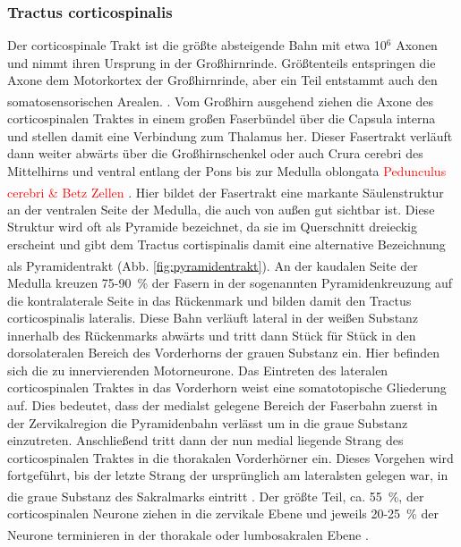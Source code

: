 \documentclass[12pt,a4paper,pdftex]{article}
\begin{document}
\subsubsection{Tractus corticospinalis} 
Der corticospinale Trakt ist die größte absteigende Bahn mit etwa 10$^{6}$ Axonen und nimmt ihren Ursprung in der Großhirnrinde. Größtenteils entspringen die Axone dem Motorkortex der Großhirnrinde, aber ein Teil entstammt auch den somatosensorischen Arealen. \textsuperscript{\cite[14]{neurowissenschaften_baer}}. 
Vom Großhirn ausgehend ziehen die Axone des corticospinalen Traktes in einem großen Faserbündel über die Capsula interna und stellen damit eine Verbindung zum Thalamus her. Dieser Fasertrakt verläuft dann weiter abwärts über die Großhirnschenkel oder auch Crura cerebri des Mittelhirns und ventral entlang der Pons bis zur Medulla oblongata \textcolor{red}{Pedunculus cerebri \& Betz Zellen} \textsuperscript{\cite[8]{crossman2014neuroanatomy}}. Hier bildet der Fasertrakt eine markante Säulenstruktur an der ventralen Seite der Medulla, die auch von außen gut sichtbar ist. Diese Struktur wird oft als Pyramide bezeichnet, da sie im Querschnitt dreieckig erscheint und gibt dem Tractus cortispinalis damit eine alternative Bezeichnung als Pyramidentrakt  \textsuperscript{\cite[14]{neurowissenschaften_baer}} (Abb. \ref{fig:pyramidentrakt}). An der kaudalen Seite der Medulla kreuzen 75-90~\% der Fasern in der sogenannten Pyramidenkreuzung auf die kontralaterale Seite in das Rückenmark und bilden damit den Tractus corticospinalis lateralis. Diese Bahn verläuft lateral in der weißen Substanz innerhalb des Rückenmarks abwärts und tritt dann Stück für Stück in den dorsolateralen Bereich des Vorderhorns der grauen Substanz ein. Hier befinden sich die zu innervierenden Motorneurone. Das Eintreten des lateralen corticospinalen Traktes in das Vorderhorn weist eine somatotopische Gliederung auf. Dies bedeutet, dass der medialst gelegene Bereich der Faserbahn zuerst in der Zervikalregion die Pyramidenbahn verlässt um in die graue Substanz einzutreten. Anschließend tritt dann der nun medial liegende Strang des corticospinalen Traktes in die thorakalen Vorderhörner ein. Dieses Vorgehen wird fortgeführt, bis der letzte Strang der ursprünglich am lateralsten gelegen war, in die graue Substanz des Sakralmarks eintritt \textsuperscript{\cite[3]{trepel2011neuroanatomie}}. Der größte Teil, ca. 55~\%, der corticospinalen Neurone ziehen in die zervikale Ebene und jeweils 20-25~\% der Neurone terminieren in der thorakale oder lumbosakralen Ebene \textsuperscript{\cite[8]{crossman2014neuroanatomy}}. \\
\end{document}
